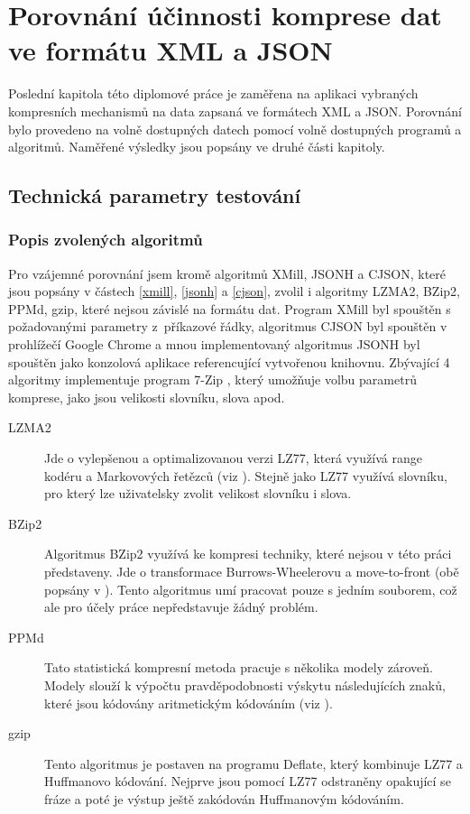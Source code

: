 \chapter{Porovnání účinnosti komprese dat ve formátu XML a JSON}
\label{kapitolaPorovnaniUcinnosti}
Poslední kapitola této diplomové práce je zaměřena na aplikaci vybraných kompresních mechanismů na data zapsaná ve formátech XML a JSON. Porovnání bylo provedeno na volně dostupných datech pomocí volně dostupných programů a algoritmů. Naměřené výsledky jsou popsány ve druhé části kapitoly.

\section{Technická parametry testování}

\subsection{Popis zvolených algoritmů}
Pro vzájemné porovnání jsem kromě algoritmů XMill, JSONH a CJSON, které jsou popsány v částech \ref{xmill}, \ref{jsonh} a \ref{cjson}, zvolil i algoritmy LZMA2, BZip2, PPMd, gzip, které nejsou závislé na formátu dat. Program XMill byl spouštěn s požadovanými parametry z~příkazové řádky, algoritmus CJSON byl spouštěn v prohlížečí Google Chrome a mnou implementovaný algoritmus JSONH byl spouštěn jako konzolová aplikace referencující vytvořenou knihovnu. Zbývající 4 algoritmy implementuje program 7-Zip \cite{7zip}, který umožňuje volbu parametrů komprese, jako jsou velikosti slovníku, slova apod.

\begin{description}
\item[LZMA2] Jde o vylepšenou a optimalizovanou verzi LZ77, která využívá range kodéru a Markovových řetězců (viz \cite{introductionToDataCompression}). Stejně jako LZ77 využívá slovníku, pro který lze uživatelsky zvolit velikost slovníku i slova. %
\item[BZip2] Algoritmus BZip2 využívá ke kompresi techniky, které nejsou v této práci před\-sta\-ve\-ny. Jde o transformace Burrows-Wheelerovu a move-to-front (obě popsány v \cite{introductionToDataCompression}). Tento algoritmus umí pracovat pouze s jedním souborem, což ale pro účely práce ne\-před\-sta\-vu\-je žádný problém.
\item[PPMd] Tato statistická kompresní metoda pracuje s několika modely zároveň. Modely slouží k výpočtu pravděpodobnosti výskytu následujících znaků, které jsou kódovány aritmetickým kódováním (viz \cite{introductionToDataCompression}).
\item[gzip] Tento algoritmus je postaven na programu Deflate, který kombinuje LZ77 a Huffmanovo kódování. Nejprve jsou pomocí LZ77 odstraněny opakující se fráze a poté je výstup ještě zakódován Huffmanovým kódováním. 
\end{description}

